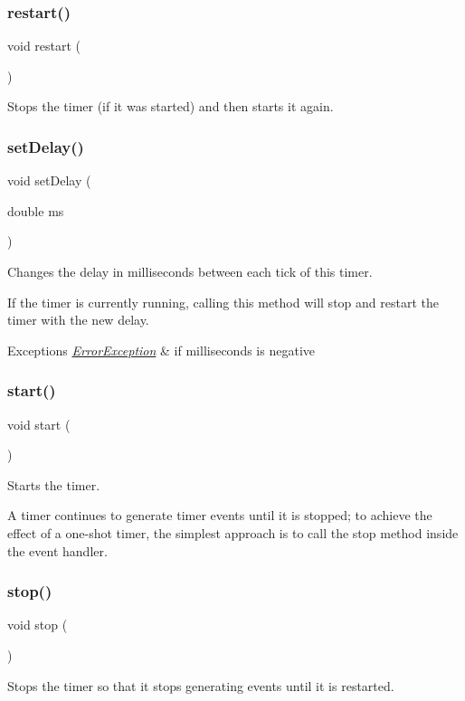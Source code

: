 \subsubsection{\texorpdfstring{restart()}{restart()}}
{\footnotesize\ttfamily void restart (\begin{DoxyParamCaption}{ }\end{DoxyParamCaption})}



Stops the timer (if it was started) and then starts it again. 

\mbox{\label{classGTimer_acebfcbc48c6acd460dac117a8f71a92f}} 
\subsubsection{\texorpdfstring{set\+Delay()}{setDelay()}}
{\footnotesize\ttfamily void set\+Delay (\begin{DoxyParamCaption}\item[{double}]{ms }\end{DoxyParamCaption})}



Changes the delay in milliseconds between each tick of this timer. 

If the timer is currently running, calling this method will stop and restart the timer with the new delay.


\begin{DoxyExceptions}{Exceptions}
{\em \mbox{\hyperlink{classErrorException}{Error\+Exception}}} & if milliseconds is negative \\
\hline
\end{DoxyExceptions}
\mbox{\label{classGTimer_a60de64d75454385b23995437f1d72669}} 
\subsubsection{\texorpdfstring{start()}{start()}}
{\footnotesize\ttfamily void start (\begin{DoxyParamCaption}{ }\end{DoxyParamCaption})}



Starts the timer. 

A timer continues to generate timer events until it is stopped; to achieve the effect of a one-\/shot timer, the simplest approach is to call the {\ttfamily stop} method inside the event handler. \mbox{\label{classGTimer_a8c528baf37154d347366083f0f816846}} 
\subsubsection{\texorpdfstring{stop()}{stop()}}
{\footnotesize\ttfamily void stop (\begin{DoxyParamCaption}{ }\end{DoxyParamCaption})}



Stops the timer so that it stops generating events until it is restarted. 

